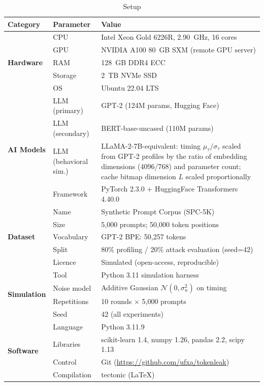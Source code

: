 \documentclass[journal,10pt,twocolumn]{IEEEtran}
\begin{document}
{\small
\begin{table}[h!]
\caption{Setup}
\label{tab:setup}
\begin{tabularx}{\columnwidth}{l X X}
\toprule
\textbf{Category} & \textbf{Parameter} & \textbf{Value} \\
\midrule
\multirow{5}{*}{\textbf{Hardware}}
  & CPU  & Intel Xeon Gold 6226R, 2.90~GHz, 16 cores \\
  & GPU  & NVIDIA A100 80~GB SXM (remote GPU server) \\
  & RAM  & 128~GB DDR4 ECC \\
  & Storage & 2~TB NVMe SSD \\
  & OS  & Ubuntu 22.04 LTS \\
\midrule
\multirow{4}{*}{\textbf{AI Models}}
  & LLM (primary) & GPT-2 (124M params, Hugging Face) \\
  & LLM (secondary) & BERT-base-uncased (110M params) \\
  & LLM (behavioral sim.) & LLaMA-2-7B-equivalent: timing $\mu_\tau/\sigma_\tau$ scaled from GPT-2 profiles by the ratio of embedding dimensions (4096/768) and parameter count; cache bitmap dimension $L$ scaled proportionally \\
  & Framework & PyTorch 2.3.0 + HuggingFace Transformers 4.40.0 \\
\midrule
\multirow{5}{*}{\textbf{Dataset}}
  & Name & Synthetic Prompt Corpus (SPC-5K) \\
  & Size & 5{,}000 prompts; 50{,}000 token positions \\
  & Vocabulary & GPT-2 BPE: 50{,}257 tokens \\
  & Split & 80\% profiling / 20\% attack evaluation (seed=42) \\
  & Licence & Simulated (open-access, reproducible) \\
\midrule
\multirow{4}{*}{\textbf{Simulation}}
  & Tool & Python 3.11 simulation harness \\
  & Noise model & Additive Gaussian $\mathcal{N}(0, \sigma_n^2)$ on timing \\
  & Repetitions & 10 rounds $\times$ 5{,}000 prompts \\
  & Seed & 42 (all experiments) \\
\midrule
\multirow{4}{*}{\textbf{Software}}
  & Language & Python 3.11.9 \\
  & Libraries & scikit-learn 1.4, numpy 1.26, pandas 2.2, scipy 1.13 \\
  & Control & Git (\url{https://github.com/ufxa/tokenleak}) \\
  & Compilation & tectonic (LaTeX) \\
\bottomrule
\end{tabularx}
\end{table}
}
\FloatBarrier
\end{document}
